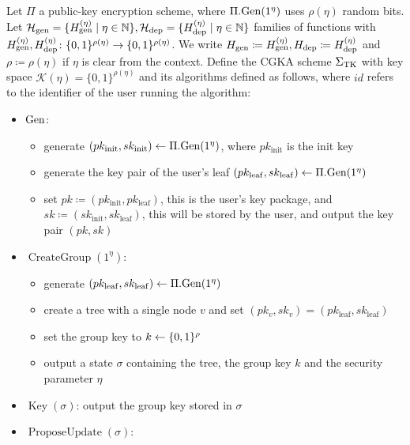 \begin{definition} Let $\Pi$ a public-key encryption scheme, where $\Pi.\mathrm{Gen}(1^\eta)$ uses $\rho(\eta)$ random bits. Let $\mathcal{H}_\mathrm{gen} = \{ H_\mathrm{gen}^{(\eta)} \mid \eta \in \mathbb{N}\}, \mathcal{H}_\mathrm{dep} = \{ H_\mathrm{dep}^{(\eta)} \mid \eta \in \mathbb{N}\}$ families of functions with $H_\mathrm{gen}^{(\eta)}, H_\mathrm{dep}^{(\eta)} \colon \{0, 1\}^{\rho(\eta)} \to \{0, 1\}^{\rho(\eta)}$. We write $H_\mathrm{gen} \coloneqq H_\mathrm{gen}^{(\eta)}, H_\mathrm{dep} \coloneqq H_\mathrm{dep}^{(\eta)}$ and $\rho \coloneqq \rho(\eta)$ if $\eta$ is clear from the context. Define the CGKA scheme $\Sigma_{\mathrm{TK}}$ with key space $\mathcal{K}(\eta) = \{0, 1\}^{\rho(\eta)}$ and its algorithms defined as follows, where $id$ refers to the identifier of the user running the algorithm:
	\begin{itemize}
		\item $\mathrm{Gen}$:
		      \begin{itemize}
			      \item generate $(pk_{\mathrm{init}}, sk_{\mathrm{init}}) \leftarrow \Pi.\mathrm{Gen}(1^\eta)$, where $pk_{\mathrm{init}}$ is the init key
			      \item generate the key pair of the user's leaf $(pk_{\mathrm{leaf}}, sk_{\mathrm{leaf}}) \leftarrow \Pi.\mathrm{Gen}(1^\eta)$
			      \item set $pk \coloneqq (pk_{\mathrm{init}}, pk_{\mathrm{leaf}})$, this is the user's key package, and $sk \coloneqq (sk_{\mathrm{init}}, sk_{\mathrm{leaf}})$, this will be stored by the user, and output the key pair $(pk, sk)$
		      \end{itemize}
		\item $\operatorname{CreateGroup}(1^\eta)$:
		      \begin{itemize}
			      \item generate $(pk_{\mathrm{leaf}}, sk_{\mathrm{leaf}}) \leftarrow \Pi.\mathrm{Gen}(1^\eta)$
			      \item create a tree with a single node $v$ and set $(pk_v, sk_v) = (pk_{\mathrm{leaf}}, sk_{\mathrm{leaf}})$
			      \item set the group key to $k \leftarrow \{0, 1\}^\rho$
			      \item output a state $\sigma$ containing the tree, the group key $k$ and the security parameter $\eta$
		      \end{itemize}
		\item $\operatorname{Key}(\sigma)$: output the group key stored in $\sigma$
		\item $\operatorname{ProposeUpdate}(\sigma)$:
		      \begin{itemize}

\end{itemize}
\end{itemize}
\end{definition}
